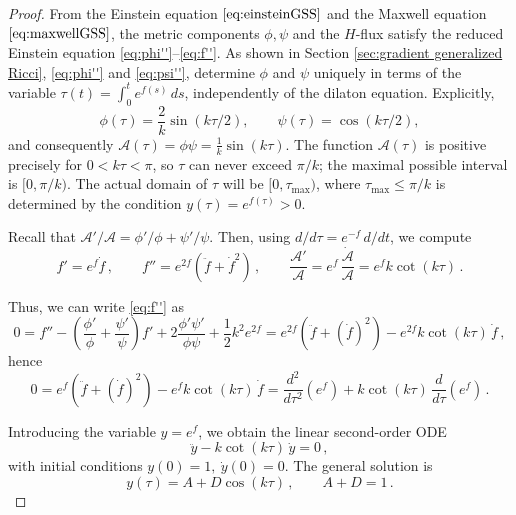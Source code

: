 \documentclass[12pt,a4paper,reqno]{amsart}
\theoremstyle{plain}
\theoremstyle{remark}
\numberwithin{equation}{section}
\newcommand{\cA}{\mathcal{A}}
\begin{document}
\begin{proof}
From the Einstein equation $\eqref{eq:einsteinGSS}$ and the Maxwell equation $\eqref{eq:maxwellGSS}$, the metric components $\phi,\psi$ and the $H$-flux satisfy the reduced Einstein equation \eqref{eq:phi''}–\eqref{eq:f''}. As shown in Section \ref{sec:gradient generalized Ricci}, \eqref{eq:phi''} and \eqref{eq:psi''}, determine $\phi$ and $\psi$ uniquely in terms of the variable $\tau(t) = \int_0^t e^{f(s)} \,ds$, independently of the dilaton equation. Explicitly,
\begin{equation*}
\phi(\tau) = \frac{2}{k}\sin(k\tau/2),\qquad \psi(\tau) = \cos(k\tau/2),
\end{equation*}
and consequently $\cA(\tau) = \phi\psi = \frac{1}{k}\sin(k\tau)$. The function $\cA(\tau)$ is positive precisely for $0 < k\tau < \pi$, so $\tau$ can never exceed $\pi/k$; the maximal possible interval is $[0,\pi/k)$. The actual domain of $\tau$ will be $[0,\tau_{\max})$, where $\tau_{\max} \le \pi/k$ is determined by the condition $y(\tau) = e^{f(\tau)} > 0$.

Recall that $\cA'/\cA=\phi'/\phi+\psi'/\psi$. Then, using $d/d\tau=e^{-f}\,d/dt$, we compute
\begin{equation*}
f' = e^f\dot{f} \,, \qquad f'' = e^{2f}(\ddot f + \dot{f}^2) \,, \qquad \frac{\cA'}{\cA} = e^f \,\frac{\dot{\cA}}{\cA} = e^f k\cot(k\tau) \,.
\end{equation*}

Thus, we can write \eqref{eq:f''} as
\begin{equation*}
0 = f'' - \left(\frac{\phi'}{\phi} + \frac{\psi'}{\psi}\right) f' + 2\frac{\phi'\psi'}{\phi\psi} + \frac{1}{2}k^2 e^{2f} = e^{2f}(\ddot{f} + (\dot{f})^2) - e^{2f} k\cot(k\tau) \,\dot{f} \,,
\end{equation*}
hence
\begin{equation*}
0 = e^f(\ddot{f} + (\dot{f})^2) - e^f k\cot(k\tau) \,\dot{f} = \frac{d^2}{d\tau^2}(e^f) + k\cot(k\tau) \,\frac{d}{d\tau}(e^f) \,.
\end{equation*}

Introducing the variable $y=e^f$, we obtain the linear second-order ODE
\begin{equation*}
\ddot{y} - k\cot(k\tau)\,\dot{y} = 0 \,,
\end{equation*}
with initial conditions $y(0)=1,\ \dot{y}(0)=0$. The general solution is
\begin{equation}\label{eq:ysolution}
y(\tau) = A + D\cos(k\tau) \,, \qquad A+D=1 \,.
\end{equation}


\end{proof}
\end{document}
